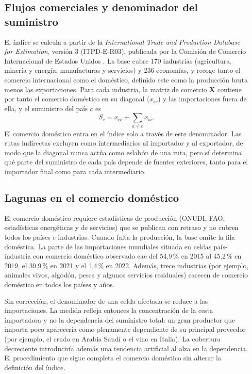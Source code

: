\documentclass[final,1p,times,authoryear]{elsarticle}
\begin{document}
\subsection{Flujos comerciales y denominador del suministro}
El índice se calcula a partir de la \textit{International Trade and Production Database for Estimation}, versión 3 (ITPD-E-R03), publicada por la Comisión de Comercio Internacional de Estados Unidos \citep{Borchert2021}. La base cubre 170 industrias (agricultura, minería y energía, manufacturas y servicios) y 236 economías, y recoge tanto el comercio internacional como el doméstico, definido este como la producción bruta menos las exportaciones. Para cada industria, la matriz de comercio $\mathbf{X}$ contiene por tanto el comercio doméstico en su diagonal ($x_{cc}$) y las importaciones fuera de ella, y el suministro del país $c$ es
\begin{equation}
S_c = x_{cc} + \sum_{a \neq c} x_{ac}.
\end{equation}
El comercio doméstico entra en el índice solo a través de este denominador. Las rutas indirectas excluyen como intermediarios al importador y al exportador, de modo que la diagonal nunca actúa como eslabón de una ruta, pero sí determina qué parte del suministro de cada país depende de fuentes exteriores, tanto para el importador final como para cada intermediario.

\subsection{Lagunas en el comercio doméstico}
El comercio doméstico requiere estadísticas de producción (ONUDI, FAO, estadísticas energéticas y de servicios) que se publican con retraso y no cubren todos los países e industrias. Cuando falta la producción, la base omite la fila doméstica. La parte de las importaciones mundiales situada en celdas país-industria con comercio doméstico observado cae del 54,9\,\% en 2015 al 45,2\,\% en 2019, el 39,9\,\% en 2021 y el 1,4\,\% en 2022. Además, trece industrias (por ejemplo, animales vivos, algodón, pesca y algunos servicios residuales) carecen de comercio doméstico en todos los países y años.

Sin corrección, el denominador de una celda afectada se reduce a las importaciones. La medida refleja entonces la concentración de la cesta importadora y no la dependencia del suministro total: un gran productor que importa poco aparecería como plenamente dependiente de su principal proveedor (por ejemplo, el crudo en Arabia Saudí o el vino en Italia). La cobertura decreciente introduciría además una tendencia artificial al alza en la dependencia. El procedimiento que sigue completa el comercio doméstico sin alterar la definición del índice.
\end{document}
